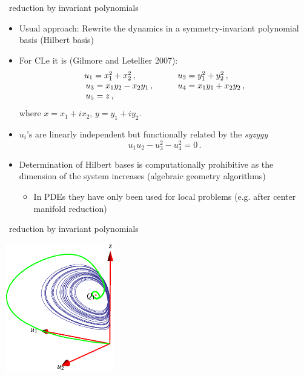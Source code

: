 \documentclass{beamer}
\begin{document}
\begin{frame}{\CLe\ reduction by invariant polynomials}

\begin{itemize}
 \item Usual approach: Rewrite the dynamics in a symmetry-invariant polynomial basis (Hilbert basis)
 \item For CLe it is (Gilmore and Letellier 2007):
		\[
		\begin{array}{ll}
			u_1 = x_1^2+x_2^2\,, &\qquad u_2 = y_1^2+y_2^2 \,, \\ \,
			u_3 = x_1 y_2-x_2 y_1\,, &\qquad u_4 = x_1 y_1+x_2 y_2\,, \\ \,
			u_5 = z\,,
		\end{array}
		\]
	where $x=x_1+i x_2$, $y=y_1+i y_2$.
 \item $u_i$'s are linearly independent but functionally related by the \emph{syzygy}
	\[
 		u_1 u_2 -u_3^2-u_4^2 =0\,.
	\]
 \item<alert@1-> Determination of Hilbert bases is computationally prohibitive as the dimension of the system increases (algebraic geometry algorithms)
 	\begin{itemize}
    	\item<alert@1-> In PDEs they have only been used for local problems (e.g. after center manifold reduction)
    	\end{itemize}
\end{itemize}

\end{frame}

\begin{frame}{\CLe\ reduction by invariant polynomials}

\begin{center}
  \includegraphics[width=0.36\textwidth]{../../figs/CLEip2} 
\end{center}

\end{frame}
\end{document}
